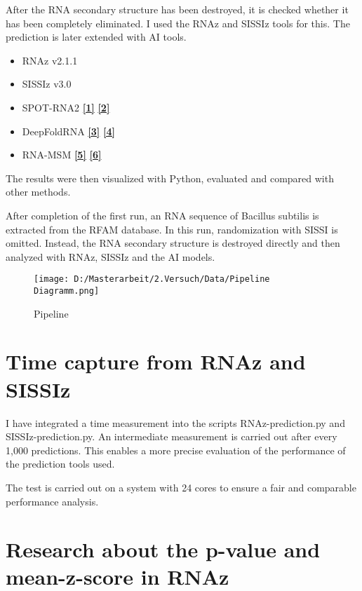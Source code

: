 \documentclass{article}
\begin{document}
\begin{large}
\begin{large}
After the RNA secondary structure has been destroyed, it is checked whether it has been completely eliminated. I used the RNAz and SISSIz tools for this. The prediction is later extended with AI tools.

\begin{itemize}
    \item RNAz v2.1.1
    \item SISSIz v3.0
    \item SPOT-RNA2 \href{https://doi.org/10.1093/bioinformatics/btab165}{\textbf{[1]}} \href{https://github.com/jaswindersingh2/SPOT-RNA2}{\textbf{[2]}}
    \item DeepFoldRNA \href{https://doi.org/10.1101/2022.05.15.491755}{\textbf{[3]}} \href{https://github.com/robpearc/DeepFoldRNA}{\textbf{[4]}}
    \item RNA-MSM \href{https://doi.org/10.1093/nar/gkad1031}{\textbf{[5]}} \href{https://github.com/yikunpku/RNA-MSM}{\textbf{[6]}} 
\end{itemize}

The results were then visualized with Python, evaluated and compared with other methods.

After completion of the first run, an RNA sequence of Bacillus subtilis is extracted from the RFAM database. In this run, randomization with SISSI is omitted. Instead, the RNA secondary structure is destroyed directly and then analyzed with RNAz, SISSIz and the AI models.

\begin{figure}[H]
    \centering
    \texttt{[image: D:/Masterarbeit/2.Versuch/Data/Pipeline Diagramm.png]}
    \caption{Pipeline}
\end{figure}

\section{Time capture from RNAz and SISSIz}

I have integrated a time measurement into the scripts RNAz-prediction.py and SISSIz-prediction.py. An intermediate measurement is carried out after every 1,000 predictions. This enables a more precise evaluation of the performance of the prediction tools used.

The test is carried out on a system with 24 cores to ensure a fair and comparable performance analysis.

\section{Research about the p-value and mean-z-score in RNAz}


\end{large}
\end{large}
\end{document}
